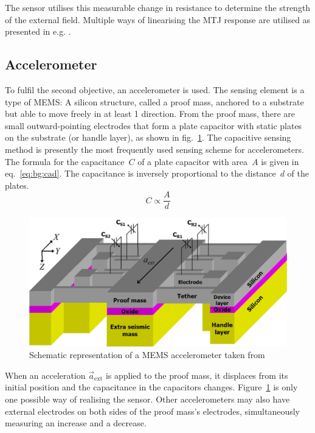 The sensor utilises this measurable change in resistance to determine the strength of the external field. Multiple ways of linearising the \ac{MTJ} response are utilised as presented in e.g. \parencite{yan2022}.

\subsection{Accelerometer \label{sec:bg:accelerometers}}
To fulfil the second objective, an accelerometer is used. The sensing element is a type of \ac{MEMS}: A silicon structure, called a proof mass, anchored to a substrate but able to move freely in at least 1 direction. From the proof mass, there are small outward-pointing electrodes that form a plate capacitor with static plates on the substrate (or handle layer), as shown in fig.~\ref{fig:bg:mems_accelerometer}. The capacitive sensing method is presently the most frequently used sensing scheme for accelerometers. The formula for the capacitance~$C$ of a plate capacitor with area~$A$ is given in eq.~\eqref{eq:bg:cad}. The capacitance is inversely proportional to the distance~$d$ of the plates.
\begin{equation}
    C\propto\frac{A}{d}
    \label{eq:bg:cad}
\end{equation}

\begin{figure}[H]
    \centering
    \includegraphics[width=0.6\linewidth]{images/01_background/mems_acc_diagram.png}
    \caption{Schematic representation of a \ac{MEMS} accelerometer taken from \parencite{abdolvand2007}}
    \label{fig:bg:mems_accelerometer}
\end{figure}

When an acceleration $\vec{a}_{\mathrm{ext}}$ is applied to the proof mass, it displaces from its initial position and the capacitance in the capacitors changes. Figure~\ref{fig:bg:mems_accelerometer} is only one possible way of realising the sensor. Other accelerometers may also have external electrodes on both sides of the proof mass's electrodes, simultaneously measuring an increase and a decrease. 


